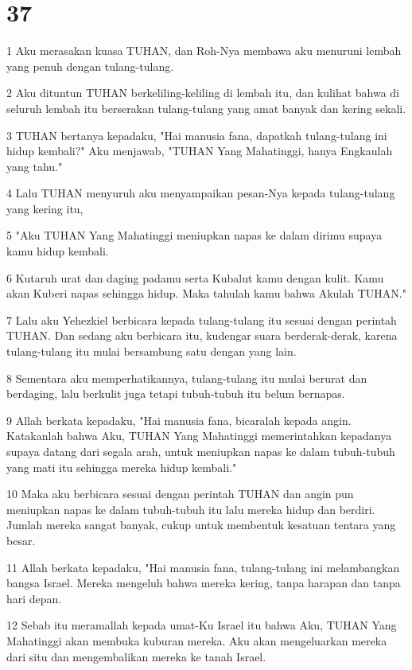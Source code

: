 \chapter{37}

\par 1 Aku merasakan kuasa TUHAN, dan Roh-Nya membawa aku menuruni lembah yang penuh dengan tulang-tulang.
\par 2 Aku dituntun TUHAN berkeliling-keliling di lembah itu, dan kulihat bahwa di seluruh lembah itu berserakan tulang-tulang yang amat banyak dan kering sekali.
\par 3 TUHAN bertanya kepadaku, "Hai manusia fana, dapatkah tulang-tulang ini hidup kembali?" Aku menjawab, "TUHAN Yang Mahatinggi, hanya Engkaulah yang tahu."
\par 4 Lalu TUHAN menyuruh aku menyampaikan pesan-Nya kepada tulang-tulang yang kering itu,
\par 5 "Aku TUHAN Yang Mahatinggi meniupkan napas ke dalam dirimu supaya kamu hidup kembali.
\par 6 Kutaruh urat dan daging padamu serta Kubalut kamu dengan kulit. Kamu akan Kuberi napas sehingga hidup. Maka tahulah kamu bahwa Akulah TUHAN."
\par 7 Lalu aku Yehezkiel berbicara kepada tulang-tulang itu sesuai dengan perintah TUHAN. Dan sedang aku berbicara itu, kudengar suara berderak-derak, karena tulang-tulang itu mulai bersambung satu dengan yang lain.
\par 8 Sementara aku memperhatikannya, tulang-tulang itu mulai berurat dan berdaging, lalu berkulit juga tetapi tubuh-tubuh itu belum bernapas.
\par 9 Allah berkata kepadaku, "Hai manusia fana, bicaralah kepada angin. Katakanlah bahwa Aku, TUHAN Yang Mahatinggi memerintahkan kepadanya supaya datang dari segala arah, untuk meniupkan napas ke dalam tubuh-tubuh yang mati itu sehingga mereka hidup kembali."
\par 10 Maka aku berbicara sesuai dengan perintah TUHAN dan angin pun meniupkan napas ke dalam tubuh-tubuh itu lalu mereka hidup dan berdiri. Jumlah mereka sangat banyak, cukup untuk membentuk kesatuan tentara yang besar.
\par 11 Allah berkata kepadaku, "Hai manusia fana, tulang-tulang ini melambangkan bangsa Israel. Mereka mengeluh bahwa mereka kering, tanpa harapan dan tanpa hari depan.
\par 12 Sebab itu meramallah kepada umat-Ku Israel itu bahwa Aku, TUHAN Yang Mahatinggi akan membuka kuburan mereka. Aku akan mengeluarkan mereka dari situ dan mengembalikan mereka ke tanah Israel.
